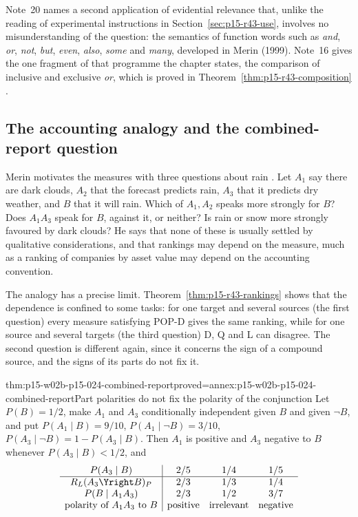 Note~20 names a second application of evidential relevance that, unlike
the reading of experimental instructions in Section~\ref{sec:p15-r43-use},
involves no misunderstanding of the question: the semantics of function
words such as \emph{and}, \emph{or}, \emph{not}, \emph{but},
\emph{even}, \emph{also}, \emph{some} and \emph{many}, developed in
Merin (1999). Note~16 gives the one fragment of that programme the
chapter states, the comparison of inclusive and exclusive \emph{or},
which is proved in Theorem~\ref{thm:p15-r43-composition}
\cite[p.~274, nn.~16, 20]{Merin2021Relevance}.

\subsection{The accounting analogy and the combined-report question}
\label{sec:p15-w02b-p15-024-open-questions}

Merin motivates the measures with three questions about rain
\cite[p.~268]{Merin2021Relevance}. Let \(A_1\) say there are dark
clouds, \(A_2\) that the forecast predicts rain, \(A_3\) that it
predicts dry weather, and \(B\) that it will rain. Which of \(A_1,A_2\)
speaks more strongly for \(B\)? Does \(A_1A_3\) speak for \(B\),
against it, or neither? Is rain or snow more strongly favoured by dark
clouds? He says that none of these is usually settled by qualitative
considerations, and that rankings may depend on the measure, much as a
ranking of companies by asset value may depend on the accounting
convention.

The analogy has a precise limit. Theorem~\ref{thm:p15-r43-rankings}
shows that the dependence is confined to some tasks: for one target and
several sources (the first question) every measure satisfying POP-D gives
the same ranking, while for one source and several targets (the third
question) D, Q and L can disagree. The second question is different
again, since it concerns the sign of a compound source, and the signs of
its parts do not fix it.

\begin{hbtheorem}{thm:p15-w02b-p15-024-combined-report}{proved=annex:p15-w02b-p15-024-combined-report}{Part polarities do not fix the polarity of the conjunction}
Let \(P(B)=1/2\), make \(A_1\) and \(A_3\) conditionally independent
given \(B\) and given \(\neg B\), and put \(P(A_1\mid B)=9/10\),
\(P(A_1\mid\neg B)=3/10\), \(P(A_3\mid\neg B)=1-P(A_3\mid B)\).
Then \(A_1\) is positive and \(A_3\) negative to \(B\) whenever
\(P(A_3\mid B)<1/2\), and
\[
\begin{array}{c|ccc}
P(A_3\mid B)&2/5&1/4&1/5\\\hline
R_L(A_3\Yright B)_P&2/3&1/3&1/4\\
P(B\mid A_1A_3)&2/3&1/2&3/7\\
\text{polarity of }A_1A_3\text{ to }B&\text{positive}&\text{irrelevant}&\text{negative}
\end{array}
\]
\end{hbtheorem}

